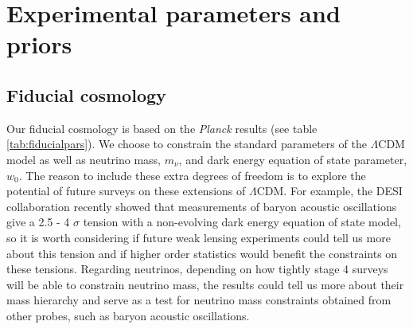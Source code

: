 \documentclass[11pt]{article} %
\begin{document}
\section{Experimental parameters and priors}\label{sec:calcdetails}
\subsection{Fiducial cosmology}
Our fiducial cosmology is based on the \textit{Planck} results \cite{planckresults} (see table \ref{tab:fiducialpars}). We choose to constrain the standard parameters of the $\Lambda$CDM model as well as neutrino mass, $m_\nu$, and dark energy equation of state parameter, $w_0$. The reason to include these extra degrees of freedom is to explore the potential of future surveys on these extensions of $\Lambda$CDM. For example, the DESI collaboration \cite{Roy2024DESI} recently showed that measurements of baryon acoustic oscillations give a 2.5 - 4 $\sigma$ tension with a non-evolving dark energy equation of state model, so it is worth considering if future weak lensing experiments could tell us more about this tension and if higher order statistics would benefit the constraints on these tensions. Regarding neutrinos, depending on how tightly stage 4 surveys will be able to constrain neutrino mass, the results could tell us more about their mass hierarchy and serve as a test for neutrino mass constraints obtained from other probes, such as baryon acoustic oscillations.
\end{document}
